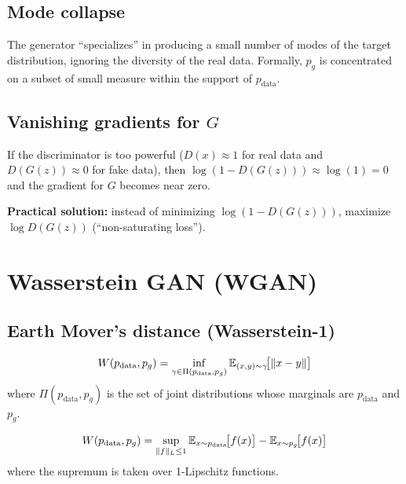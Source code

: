 \subsection{Mode collapse}

\begin{definition}
The generator ``specializes'' in producing a small number of modes of the target distribution, ignoring the diversity of the real data. Formally, $p_g$ is concentrated on a subset of small measure within the support of $p_{\text{data}}$.
\end{definition}

\subsection{Vanishing gradients for $G$}

\begin{warning}
If the discriminator is too powerful ($D(x) \approx 1$ for real data and $D(G(z)) \approx 0$ for fake data), then $\log(1 - D(G(z))) \approx \log(1) = 0$ and the gradient for $G$ becomes near zero.

\textbf{Practical solution:} instead of minimizing $\log(1 - D(G(z)))$, maximize $\log D(G(z))$ (``non-saturating loss'').
\end{warning}

\section{Wasserstein GAN (WGAN)}
\label{sec:wgan}

\subsection{Earth Mover's distance (Wasserstein-1)}

\begin{definition}
\begin{equation}
W(p_{\text{data}}, p_g) = \inf_{\gamma \in \Pi(p_{\text{data}}, p_g)} \mathbb{E}_{(x, y) \sim \gamma}\!\big[\|x - y\|\big]
\end{equation}
where $\Pi(p_{\text{data}}, p_g)$ is the set of joint distributions whose marginals are $p_{\text{data}}$ and $p_g$.
\end{definition}

\begin{theorem}
\begin{equation}
W(p_{\text{data}}, p_g) = \sup_{\|f\|_L \leq 1} \mathbb{E}_{x \sim p_{\text{data}}}\!\big[f(x)\big] - \mathbb{E}_{x \sim p_g}\!\big[f(x)\big]
\label{eq:kantorovich}
\end{equation}
where the supremum is taken over 1-Lipschitz functions.
\end{theorem}

